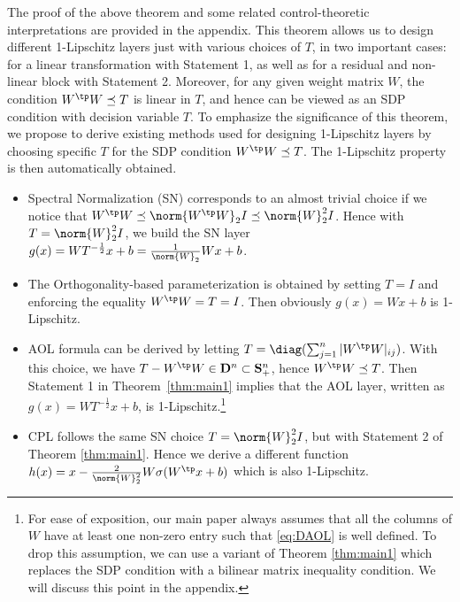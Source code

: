 \documentclass{article} \usepackage{iclr2023_conference,times}
\newcommand{\SC}{\mathbf{S}}
\newcommand{\D}{\mathbf{D}}
\newcommand{\0}{\mathbf{0} }
\begin{document}
The proof of the above theorem and some related control-theoretic interpretations are provided in the appendix.
This theorem allows us to design different 1-Lipschitz layers just with various choices of $T$, in two important cases: for a linear transformation with Statement 1, as well as for a residual and non-linear block with Statement 2. Moreover, for any given weight matrix $W$, the condition $W^\tp W\preceq T$ is linear in $T$, and hence can be viewed as an SDP condition with decision variable $T$. 
To emphasize the significance of this theorem, we propose to derive existing methods used for designing 1-Lipschitz layers by choosing specific $T$ for the SDP condition $W^\tp W\preceq T$. The 1-Lipschitz property is then automatically obtained. 


\begin{itemize}
    \item {Spectral Normalization (SN)} corresponds to an almost trivial choice if we notice that $W^\tp W\preceq \norm{W^\tp W}_2 I\preceq \norm{W}_2^2 I$. Hence with $T=\norm{W}_2^2 I$, we build the SN layer $g(x)=WT^{-\frac{1}{2}}x+b=\frac{1}{\norm{W}_2}Wx+b$.
    \item The Orthogonality-based parameterization is obtained by setting $T=I$ and enforcing the equality $W^\tp W=T=I$. Then obviously $g(x)=Wx+b$ is 1-Lipschitz.
    \item AOL formula can be derived by letting  $T=\diag(\sum_{j=1}^n |W^\tp W|_{ij})$. With this choice, we have $T-W^\tp W \in \D^n \subset \SC_+^n$,  hence  $W^\tp W\preceq T$. Then Statement 1 in Theorem~\ref{thm:main1} implies that the AOL layer, written as $g(x)=WT^{-\frac{1}{2}}x+b$, is 1-Lipschitz.\footnote{For ease of exposition, our main paper always assumes that all the columns of $W$ have at least one non-zero entry such that \eqref{eq:DAOL} is well defined. To drop this assumption, we can use a variant of Theorem \ref{thm:main1} which replaces the SDP condition with a bilinear matrix inequality condition. We will discuss this point in the appendix.}
    \item CPL follows the same SN choice $T=\norm{W}_2^2 I$, but with Statement 2 of Theorem \ref{thm:main1}. Hence we derive a different function $h(x)=x-\frac{2}{\norm{W}_2^2}W\sigma(W^\tp x+b)$ which is also 1-Lipschitz.
\end{itemize}
\end{document}

